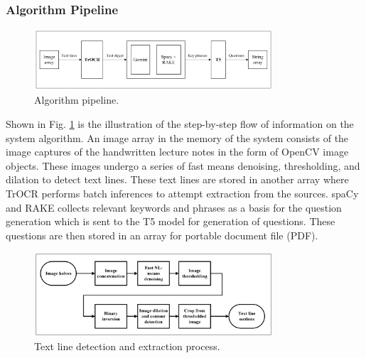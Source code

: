 \documentclass[conference]{IEEEtran}
\begin{document}
\subsubsection{Algorithm Pipeline}
\hfill
\begin{figure}[H]
\centerline{\includegraphics[width=3.5in]{pipeline.png}}
\vspace{-0.4cm}
\caption{Algorithm pipeline.} 
\label{pipeline}
\end{figure}
\indent Shown in Fig. \ref{pipeline} is the illustration 
of the step-by-step flow of information on the system 
algorithm. An image array in the memory of the system consists 
of the image captures of the handwritten lecture notes in the 
form of OpenCV image objects. These images undergo 
a series of fast means denoising, thresholding, and 
dilation to detect text lines. These text lines are stored in 
another array where TrOCR performs batch inferences to attempt 
extraction from the sources. spaCy and RAKE collects 
relevant keywords and phrases as a basis for the question generation 
which is sent to the T5 model for generation of questions. 
These questions are then stored in an array for portable document 
file (PDF).
\hfill
\begin{figure}[H]
\centerline{\includegraphics[width=3.5in]{ocr_process.png}}
\vspace{-0.4cm}
\caption{Text line detection and extraction process.} 
\label{ocr_process}
\end{figure}
\end{document}
